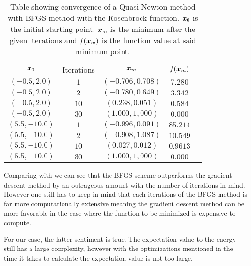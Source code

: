         \begin{table}[H]
            \centering
            \begin{tabular}{ccccc} \hline\hline
                $\boldsymbol{{x}}_0$ & Iterations & $\boldsymbol{{x}}_m$ & $f(\boldsymbol{{x}}_m)$ \\
                $(-0.5,2.0)$ & $1$ & $(-0.706,0.708)$ & $7.280$ \\
                $(-0.5,2.0)$ & $2$ & $(-0.780,0.649)$ & $3.342$ \\
                $(-0.5,2.0)$ & $10$ & $(0.238,0.051)$ & $0.584$ \\
                $(-0.5,2.0)$ & $30$ & $(1.000,1,000)$ & $0.000$ \\
                $(5.5,-10.0)$ & $1$ & $(-0.996,0.091)$ & $85.214$ \\
                $(5.5,-10.0)$ & $2$ & $(-0.908,1.087)$ & $10.549$ \\
                $(5.5,-10.0)$ & $10$ & $(0.027,0.012)$ & $0.9613$ \\
                $(5.5,-10.0)$ & $30$ & $(1.000,1,000)$ & $0.000$
            \end{tabular}
            \caption{Table showing convergence of a Quasi-Newton method with
            BFGS method with the Rosenbrock function. $\boldsymbol{{x}}_0$ is the
            initial starting point, $\boldsymbol{{x}}_m$ is the minimum after the given
            iterations and $f(\boldsymbol{{x}}_m)$ is the function value at said
            minimum point.}
            \label{tab:rosenbrockconvBFGS}
        \end{table}
    Comparing  with
     we can see that the BFGS
    scheme outperforms the gradient descent method by an outrageous amount with
    the number of iterations in mind. However one still has to keep in mind
    that each iterations of the BFGS method is far more computationally
    extensive meaning the gradient descent method can be more favorable in the
    case where the function to be minimized is expensive to compute. 

    For our case, the latter sentiment is true. The expectation value to the
    energy still has a large complexity, however with the optimizations
    mentioned in  the time it takes to
    calculate the expectation value is not too large.

